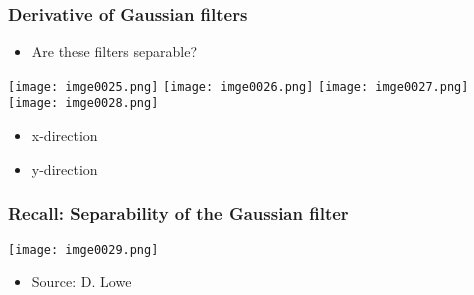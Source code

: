 \begin{frame}
\frametitle{Derivative of Gaussian filters}
\begin{itemize}
\item Are these filters separable?
\end{itemize}
\texttt{[image: imge0025.png]}
\texttt{[image: imge0026.png]}
\texttt{[image: imge0027.png]}
\texttt{[image: imge0028.png]}
\begin{itemize}
\item x-direction
\end{itemize}
\begin{itemize}
\item y-direction
\end{itemize}

\end{frame}


\begin{frame}
\frametitle{Recall: Separability of the Gaussian filter}
\texttt{[image: imge0029.png]}
\begin{itemize}
\item Source: D. Lowe
\end{itemize}

\end{frame}

